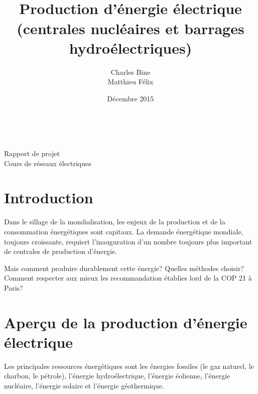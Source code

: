 \documentclass[12pt,a4paper,oneside,openany]{memoir}
\author{Charles Bine\\Matthieu Félix}
\title{\\Production d'énergie électrique (centrales nucléaires et barrages hydroélectriques)}
\date{Décembre 2015}
\begin{document}
	
\keepthetitle
\begin{titlingpage}
\noindent
\begin{minipage}[t]{0.5\textwidth} \begin{flushleft}
\theauthor \\ \thedate
\end{flushleft} \end{minipage}
\begin{minipage}[t]{0.5\textwidth} \begin{flushright}
Rapport de projet \\
Cours de réseaux électriques
\end{flushright} \end{minipage}

\vspace{3cm}
\begin{center}
{\LARGE \textbf{\thetitle}}
\end{center}
\vspace{3cm}

\end{titlingpage}

\addtolength{\marginparwidth}{11mm}
\abnormalparskip{4mm}

\clearpage

\tableofcontents
\listoffigures
\listoftables
\clearpage


\chapter{Introduction}

Dans le sillage de la mondialisation, les enjeux de la production et de la consommation énergétiques sont capitaux. La demande énergétique mondiale, toujours croissante, requiert l'inauguration d'un nombre toujours plus important de centrales de production d'énergie.

Mais comment produire durablement cette énergie? Quelles méthodes choisir? Comment respecter aux mieux les recommandation établies lord de la COP 21 à Paris? 


\chapter{Aperçu de la production d'énergie électrique}

Les principales ressources énergétiques sont les énergies fossiles (le gaz naturel, le charbon, le pétrole), l’énergie hydroélectrique, l’énergie éolienne, l’énergie nucléaire, l’énergie solaire et l'énergie géothermique. 
\end{document}
